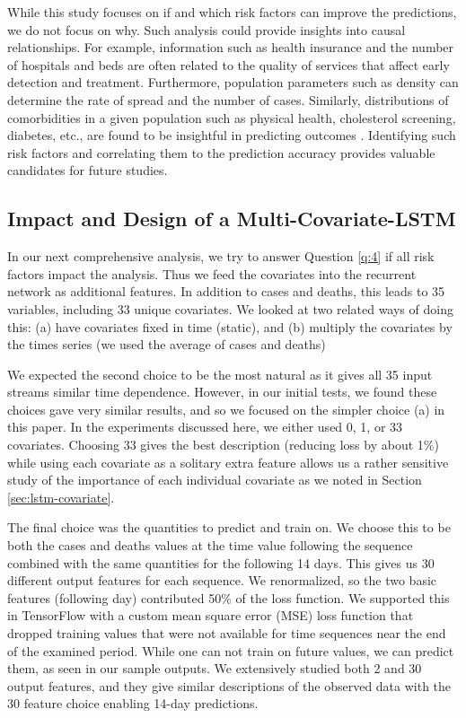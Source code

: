 \documentclass[letterpaper, inpress]{jds} %
\renewcommand{\_}{%
    \textunderscore\hspace{0pt}%
}
\begin{document}
While this study focuses on if and which risk factors can improve the
predictions, we do not focus on why. Such analysis could provide
insights into causal relationships. For example, information such as
health insurance and the number of hospitals and beds are often
related to the quality of services that affect early detection and
treatment. Furthermore, population parameters such as density can
determine the rate of spread and the number of cases. Similarly,
distributions of comorbidities in a given population such as physical
health, cholesterol screening, diabetes, etc., are found to be
insightful in predicting outcomes \citep{Maleki}. Identifying such risk
factors and correlating them to the prediction accuracy provides
valuable candidates for future studies.



\subsection{Impact and Design of a Multi-Covariate-LSTM}
\label{sec:lstm-many}

In our next comprehensive analysis, we try to answer Question
\ref{q:4} if all risk factors impact the analysis. Thus we feed the
covariates into the recurrent network as additional features. In
addition to cases and deaths, this leads to 35 variables, including 33
unique covariates. We looked at two related ways of doing this: (a)
have covariates fixed in time (static), and (b) multiply the
covariates by the times series (we used the average of cases and
deaths)

We expected the second choice to be the most natural as it gives all
35 input streams similar time dependence. However, in our initial
tests, we found these choices gave very similar results, and so we
focused on the simpler choice (a) in this paper. In the experiments
discussed here, we either used 0, 1, or 33 covariates. Choosing 33
gives the best description (reducing loss by about 1\%) while using
each covariate as a solitary extra feature allows us a rather
sensitive study of the importance of each individual covariate as we
noted in Section \ref{sec:lstm-covariate}.

The final choice was the quantities to predict and train on. We choose
this to be both the cases and deaths values at the time value
following the sequence combined with the same quantities for the
following 14 days. This gives us 30 different output features for each
sequence. We renormalized, so the two basic features (following day)
contributed 50\% of the loss function. We supported this in TensorFlow
with a custom mean square error (MSE) loss function that dropped
training values that were not available for time sequences near the
end of the examined period. While one can not train on future values,
we can predict them, as seen in our sample outputs. We extensively
studied both 2 and 30 output features, and they give similar
descriptions of the observed data with the 30 feature choice enabling
14-day predictions.
\end{document}
